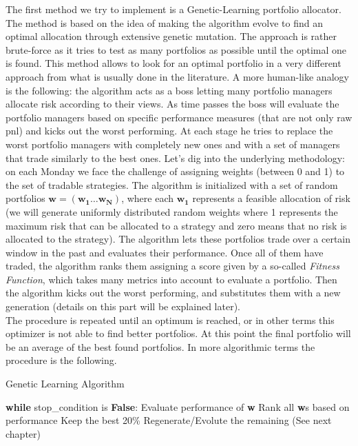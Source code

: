 The first method we try to implement is a Genetic-Learning portfolio allocator. The method is based on the idea of making the algorithm evolve to find an optimal allocation through extensive genetic mutation. The approach is rather brute-force as it tries to test as many portfolios as possible until the optimal one is found. This method allows to look for an optimal portfolio in a very different approach from what is usually done in the literature. A more human-like analogy is the following: the algorithm acts as a boss letting many portfolio managers allocate risk according to their views. As time passes the boss will evaluate the portfolio managers based on specific performance measures (that are not only raw pnl) and kicks out the worst performing. At each stage he tries to replace the worst portfolio managers with completely new ones and with a set of managers that trade similarly to the best ones. Let's dig into the underlying methodology: on each Monday we face the challenge of assigning weights (between 0 and 1) to the set of tradable strategies. The algorithm is initialized  with a set of random portfolios $\mathbf{w} = (\mathbf{w_1} \dots \mathbf{w_N})$, where each $\mathbf{w_1}$ represents a feasible allocation of risk (we will generate uniformly distributed random weights where 1 represents the maximum risk that can be allocated to a strategy and zero means that no risk is allocated to the strategy). The algorithm lets these portfolios trade over a certain window in the past and evaluates their performance. Once all of them have traded, the algorithm ranks them assigning a score given by a so-called \textit{Fitness Function}, which takes many metrics into account to evaluate a portfolio. Then the algorithm kicks out the worst performing, and substitutes them with a new generation (details on this part will be explained later).\\ 
The procedure is repeated until an optimum is reached, or in other terms this optimizer is not able to find better portfolios. At this point the final portfolio will be an average of the best found portfolios. In more algorithmic terms the procedure is the following.\\

\begin{algorithm}
	\caption{Genetic Learning Algorithm}
	\begin{algorithmic}[1]
		\scriptsize
		\STATE \textbf{while} stop\_condition is \textbf{False}:
		\STATE Evaluate performance of \textbf{w}
		\ENDFOR
		\STATE Rank all \textbf{w}s based on performance
		\STATE Keep the best 20\%
		\STATE Regenerate/Evolute the remaining (See next chapter)
		
	\end{algorithmic}
\end{algorithm}


